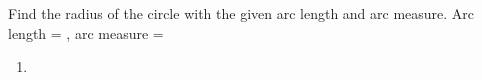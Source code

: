 Find the radius of the circle with the given arc length and arc measure.
\newline
Arc length = , arc measure = \degree
\newline
\begin{enumerate}
    \item
    \degree
{}
\end{enumerate}

